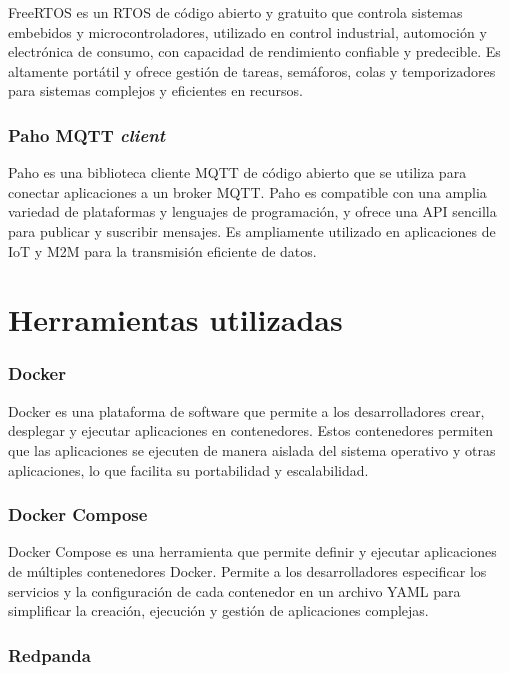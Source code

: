 FreeRTOS \citep{free-rtos} es un RTOS de código abierto y gratuito que controla sistemas embebidos y microcontroladores, utilizado en control industrial, automoción y electrónica de consumo, con capacidad de rendimiento confiable y predecible. Es altamente portátil y ofrece gestión de tareas, semáforos, colas y temporizadores para sistemas complejos y eficientes en recursos.


\subsubsection{Paho MQTT \textit{client}}

Paho \citep{paho-mqtt} es una biblioteca cliente MQTT de código abierto que se utiliza para conectar aplicaciones a un broker MQTT. Paho es compatible con una amplia variedad de plataformas y lenguajes de programación, y ofrece una API sencilla para publicar y suscribir mensajes. Es ampliamente utilizado en aplicaciones de IoT y M2M para la transmisión eficiente de datos.


\section{Herramientas utilizadas}


\subsubsection{Docker}

Docker \citep{docker} es una plataforma de software que permite a los desarrolladores crear, desplegar y ejecutar aplicaciones en contenedores. Estos contenedores permiten que las aplicaciones se ejecuten de manera aislada del sistema operativo y otras aplicaciones, lo que facilita su portabilidad y escalabilidad. 


\subsubsection{Docker Compose}

Docker Compose \citep{docker-compose} es una herramienta que permite definir y ejecutar aplicaciones de múltiples contenedores Docker. Permite a los desarrolladores especificar los servicios y la configuración de cada contenedor en un archivo YAML para simplificar la creación, ejecución y gestión de aplicaciones complejas. 


\subsubsection{Redpanda}

